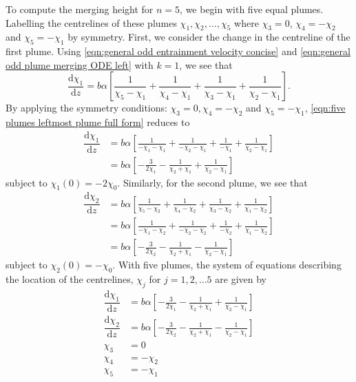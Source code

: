 \documentclass{jfm}
\newcommand{\dbyd}[2]{\dfrac{\mathrm{d} #1}{\mathrm{d}#2}} %
\begin{document}
	\noindent To compute the merging height for $n = 5$, we begin with five equal plumes. Labelling the centrelines of these plumes $\chi_1, \chi_2,\dots,\chi_5$ where $\chi_3 = 0$, $\chi_4 = -\chi_2$ and $\chi_5 = -\chi_1$ by symmetry. First, we consider the change in the centreline of the first plume. Using \eqref{eqn:general odd entrainment velocity concise} and \eqref{eqn:general odd plume merging ODE left} with $k = 1$, we see that
	\begin{equation}
		\dbyd{\chi_1}{z} = b\alpha \left[ \frac{1}{\chi_5 - \chi_1} + \frac{1}{\chi_4 - \chi_1} + \frac{1}{\chi_3 - \chi_1} + \frac{1}{\chi_2 - \chi_1} \right]\label{eqn:five plumes leftmost plume full form}.
	\end{equation}
	By applying the symmetry conditions: $\chi_3 = 0, \chi_4 = -\chi_2$ and $\chi_5 = -\chi_1$, \eqref{eqn:five plumes leftmost plume full form} reduces to 
	\begin{align}
		\dbyd{\chi_1}{z} &= b\alpha \left[\frac{1}{-\chi_1 - \chi_1} + \frac{1}{-\chi_2 - \chi_1} + \frac{1}{-\chi_1} + \frac{1}{\chi_2 - \chi_1}\right] \\
		&= b\alpha\left[-\frac{3}{2\chi_1} - \frac{1}{\chi_2 + \chi_1} + \frac{1}{\chi_2 - \chi_1}\right]
	\end{align}
	subject to $\chi_1(0) = -2\chi_0$.
	Similarly, for the second plume, we see that
	\begin{align}
		\dbyd{\chi_2}{z} &= b\alpha \left[\frac{1}{\chi_5 - \chi_2} + \frac{1}{\chi_4 - \chi_2} + \frac{1}{\chi_3 - \chi_2} + \frac{1}{\chi_1 - \chi_2}\right]\\
		&= b\alpha \left[\frac{1}{-\chi_1 - \chi_2} + \frac{1}{-\chi_2 - \chi_2} + \frac{1}{-\chi_2} + \frac{1}{\chi_1 - \chi_2}\right] \\
		&= b\alpha \left[-\frac{3}{2\chi_2} - \frac{1}{\chi_2 + \chi_1} - \frac{1}{\chi_2 - \chi_1}\right]
	\end{align}
	subject to $\chi_2(0) = -\chi_0$.
	With five plumes, the system of equations describing the location of the centrelines, $\chi_j$ for $j = 1,2,\dots 5$ are given by
	\begin{align}
		\dbyd{\chi_1}{z} &= b\alpha\left[-\frac{3}{2\chi_1} - \frac{1}{\chi_2 + \chi_1} + \frac{1}{\chi_2 - \chi_1}\right] \\
		\dbyd{\chi_2}{z} &= b\alpha \left[- \frac{3}{2\chi_2} - \frac{1}{\chi_2+\chi_1}-\frac{1}{\chi_2-\chi_1} \right] \\
		\chi_3 &= 0 \\
		\chi_4 &= -\chi_2 \\
		\chi_5 &= -\chi_1
	\end{align} 
\end{document}
